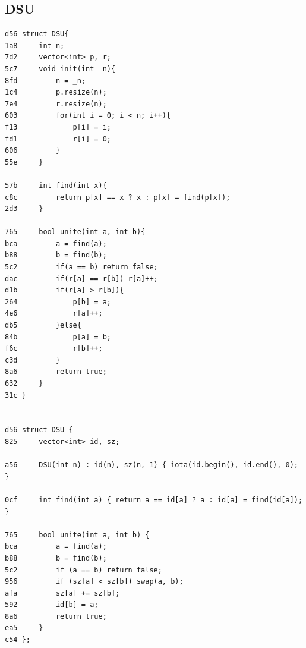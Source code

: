 \documentclass[11pt, a4paper, twoside]{article}
\begin{document}
\subsection{DSU }
\begin{lstlisting}
d56 struct DSU{
1a8     int n;
7d2     vector<int> p, r;
5c7     void init(int _n){
8fd         n = _n;
1c4         p.resize(n);
7e4         r.resize(n);
603         for(int i = 0; i < n; i++){
f13             p[i] = i;
fd1             r[i] = 0;
606         }
55e     }
    
57b     int find(int x){
c8c         return p[x] == x ? x : p[x] = find(p[x]);
2d3     }
    
765     bool unite(int a, int b){
bca         a = find(a);
b88         b = find(b);
5c2         if(a == b) return false;
dac         if(r[a] == r[b]) r[a]++;
d1b         if(r[a] > r[b]){
264             p[b] = a;
4e6             r[a]++;
db5         }else{
84b             p[a] = b;
f6c             r[b]++;
c3d         }
8a6         return true;
632     }
31c }


d56 struct DSU {
825 	vector<int> id, sz;
    
a56 	DSU(int n) : id(n), sz(n, 1) { iota(id.begin(), id.end(), 0); }
    
0cf 	int find(int a) { return a == id[a] ? a : id[a] = find(id[a]); }
    
765 	bool unite(int a, int b) {
bca 		a = find(a);
b88         b = find(b);
5c2 		if (a == b) return false;
956 		if (sz[a] < sz[b]) swap(a, b);
afa 		sz[a] += sz[b];
592         id[b] = a;
8a6         return true;
ea5 	}
c54 };

\end{lstlisting}
\end{document}
